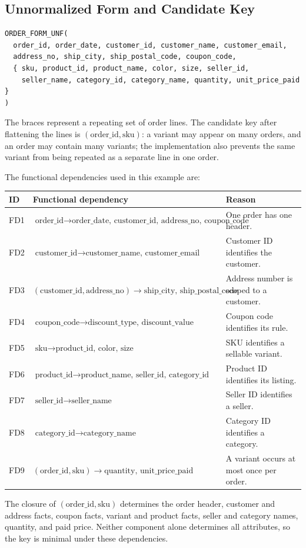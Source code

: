 \documentclass[11pt,a4paper,oneside]{report}
\begin{document}
\subsection{Unnormalized Form and Candidate Key}
\begin{lstlisting}[caption={Illustrative unnormalized order form}]
ORDER_FORM_UNF(
  order_id, order_date, customer_id, customer_name, customer_email,
  address_no, ship_city, ship_postal_code, coupon_code,
  { sku, product_id, product_name, color, size, seller_id,
    seller_name, category_id, category_name, quantity, unit_price_paid }
)
\end{lstlisting}
The braces represent a repeating set of order lines. The candidate key after flattening the lines is $(\text{order\_id},\text{sku})$: a variant may appear on many orders, and an order may contain many variants; the implementation also prevents the same variant from being repeated as a separate line in one order.

The functional dependencies used in this example are:
\begin{longtable}{P{0.10\textwidth}P{0.57\textwidth}P{0.25\textwidth}}
\toprule
\textbf{ID} & \textbf{Functional dependency} & \textbf{Reason}\\\midrule
FD1 & $\text{order\_id} \rightarrow \text{order\_date, customer\_id, address\_no, coupon\_code}$ & One order has one header.\\
FD2 & $\text{customer\_id} \rightarrow \text{customer\_name, customer\_email}$ & Customer ID identifies the customer.\\
FD3 & $(\text{customer\_id},\text{address\_no}) \rightarrow \text{ship\_city, ship\_postal\_code}$ & Address number is scoped to a customer.\\
FD4 & $\text{coupon\_code} \rightarrow \text{discount\_type, discount\_value}$ & Coupon code identifies its rule.\\
FD5 & $\text{sku} \rightarrow \text{product\_id, color, size}$ & SKU identifies a sellable variant.\\
FD6 & $\text{product\_id} \rightarrow \text{product\_name, seller\_id, category\_id}$ & Product ID identifies its listing.\\
FD7 & $\text{seller\_id} \rightarrow \text{seller\_name}$ & Seller ID identifies a seller.\\
FD8 & $\text{category\_id} \rightarrow \text{category\_name}$ & Category ID identifies a category.\\
FD9 & $(\text{order\_id},\text{sku}) \rightarrow \text{quantity, unit\_price\_paid}$ & A variant occurs at most once per order.\\
\bottomrule
\end{longtable}
The closure of $(\text{order\_id},\text{sku})$ determines the order header, customer and address facts, coupon facts, variant and product facts, seller and category names, quantity, and paid price. Neither component alone determines all attributes, so the key is minimal under these dependencies.
\end{document}

